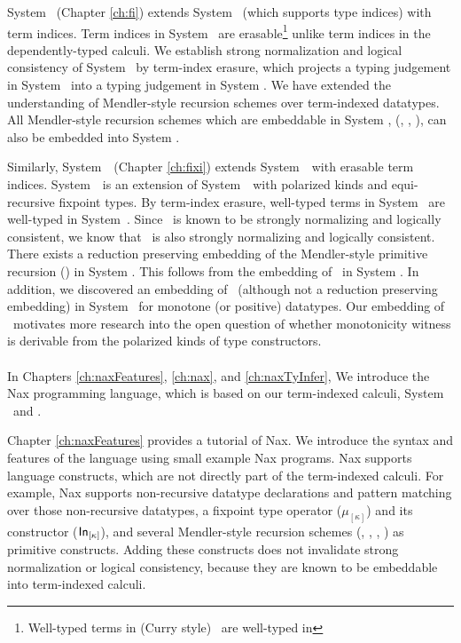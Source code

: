 System \Fi\ (Chapter \ref{ch:fi}) extends System \Fw\ (which supports
type indices) with term indices.  Term indices in System \Fi\ are 
erasable\footnote{Well-typed terms in (Curry style) \Fi\ are well-typed in \Fw} unlike term indices in the dependently-typed calculi. We establish
strong normalization and logical consistency of System \Fi\ by
term-index erasure, which projects a typing judgement in System \Fi\ into
a typing judgement in System \Fw. We have extended the understanding of
Mendler-style recursion schemes over term-indexed datatypes. All
Mendler-style recursion schemes which are embeddable in System \Fw,
(\eg, \MIt, \MsfIt), can also be embedded into System \Fi.

Similarly, System~\Fixi\ (Chapter \ref{ch:fixi}) extends System~\Fixw\ with
erasable term indices. System~\Fixw\ is an extension of System~\Fw\ with
polarized kinds and equi-recursive fixpoint types. By term-index erasure,
well-typed terms in System \Fixi\ are well-typed in System~\Fixw.
Since \Fixw\ is known to be strongly normalizing and logically consistent,
we know that \Fixi\ is also strongly normalizing and logically consistent.
There exists a reduction preserving embedding of the Mendler-style
primitive recursion (\MPr) in System \Fixi. This follows from
the embedding of \MPr\ in System \Fixw. In addition, we discovered
an embedding of \McvPr\ (although not a reduction preserving embedding)
in System \Fixi\ for monotone (or positive) datatypes. Our embedding of
\McvPr\ motivates more research into the open question of whether
monotonicity witness is derivable from the polarized kinds of type constructors.

\paragraph{}
In Chapters \ref{ch:naxFeatures}, \ref{ch:nax}, and \ref{ch:naxTyInfer},
We introduce the Nax programming language, which is based on
our term-indexed calculi, System \Fi\ and \Fixi.

Chapter \ref{ch:naxFeatures} provides a tutorial of Nax.
We introduce the syntax and features of the language
using small example Nax programs. Nax supports language constructs,
which are not directly part of the term-indexed calculi.
For example, Nax supports non-recursive datatype declarations and
pattern matching over those non-recursive datatypes,
a fixpoint type operator ($\mu_{[\kappa]}$) and
its constructor ($\mathsf{In}_{[\kappa]}$), and
several Mendler-style recursion schemes (\MIt, \MPr, \McvPr, \MsfIt)
as primitive constructs. Adding these constructs does not invalidate
strong normalization or logical consistency, because they are known to
be embeddable into term-indexed calculi.


